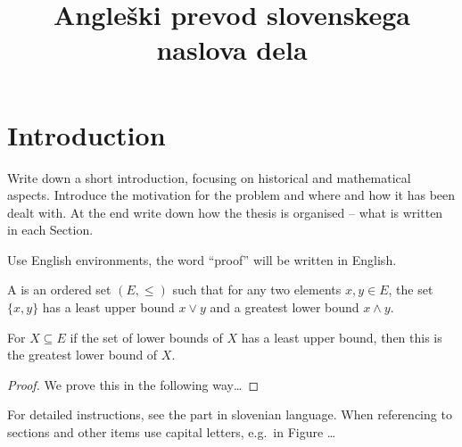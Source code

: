 \documentclass[mat2, anglescina, tisk]{fmfdelo}
\title{Angleški prevod slovenskega naslova dela}
\begin{document}
\section{Introduction}
Write down a short introduction, focusing on historical and mathematical aspects. Introduce the
motivation for the problem and where and how it has been dealt with. At the end write down how the
thesis is organised -- what is written in each Section.

Use English environments, the word ``proof'' will be written in English.
\begin{definition}
A \emph{} is an ordered set $(E, \leq)$ such that for any two elements $x,y \in E$,
the set $\{x,y\}$ has a least upper bound $x \vee y$ and a greatest lower bound $x \wedge y$.
\end{definition}

\begin{theorem}
For $X \subseteq E$ if the set of lower bounds of $X$ has a least upper bound, then this is the
greatest lower bound of $X$.
\end{theorem}

\begin{proof}
We prove this in the following way\dots
\end{proof}

For detailed instructions, see the part in slovenian language. When referencing to sections and
other items use capital letters, e.g.\ in Figure \dots
\end{document}
